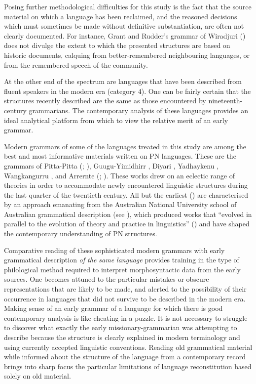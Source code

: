 Posing further methodological difficulties for this study is the fact that the source material on which a language has been reclaimed, and the reasoned decisions which must sometimes be made without definitive substantiation, are often not clearly documented. For instance, Grant and Rudder’s grammar of Wiradjuri (\citeyear{grant_grammar_2014}) does not divulge the extent to which the presented structures are based on historic documents, calquing from better-remembered neighbouring languages, or from the remembered speech of the community.

At the other end of the spectrum are languages that have been described from fluent speakers in the modern era (category 4). One can be fairly certain that the structures recently described are the same as those encountered by nineteenth-century grammarians. The contemporary analysis of these languages provides an ideal analytical platform from which to view the relative merit of an early grammar. 

Modern grammars of some of the languages treated in this study are among the best and most informative materials written on PN languages. These are the grammars of Pitta-Pitta (\citealt{blake_pitta-pitta_1971}; \citealt{blake_pitta_1979}), Guugu-Yimidhirr \citep{haviland_guugu_1979}, Diyari \citep{austin_grammar_2013}, Yadhaykenu \citep{crowley_mpakwithi_1981}, Wangkangurru \citep{hercus_grammar_1994}, and Arrernte (\citealt{wilkins_mparntwe_1989}; \citealt{henderson_topics_2013}). These works drew on an eclectic range of theories in order to accommodate newly encountered linguistic structures during the last quarter of the twentieth century. All but the earliest (\citealt{blake_pitta-pitta_1971}) are characterised by an approach emanating from the Australian National University school of Australian grammatical description (see \citealt[58--72]{wilkins_mparntwe_1989}), which produced works that “evolved in parallel to the evolution of theory and practice in linguistics” (\citealt[59]{wilkins_mparntwe_1989}) and have shaped the contemporary understanding of PN structures.

\hspace*{-2.1pt}Comparative reading of these sophisticated modern grammars with early grammatical description \textit{of the same language} provides training in the type of philological method required to interpret morphosyntactic data from the early sources. One becomes attuned to the particular mistakes or obscure representations that are likely to be made, and alerted to the possibility of their occurrence in languages that did not survive to be described in the modern era. Making sense of an early grammar of a language for which there is good contemporary analysis is like cheating in a puzzle. It is not necessary to struggle to discover what exactly the early missionary-grammarian was attempting to describe because the structure is clearly explained in modern terminology and using currently accepted linguistic conventions. Reading old grammatical material while informed about the structure of the language from a contemporary record brings into sharp focus the particular limitations of language reconstitution based solely on old material.

